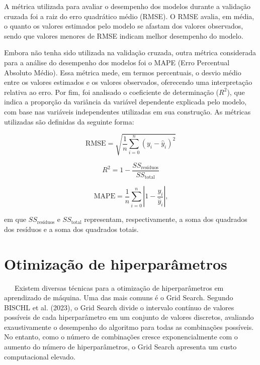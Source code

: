 \documentclass[
  12pt,
  a4paper,
]{scrreprt}
\begin{document}
\vspace{12pt}

A métrica utilizada para avaliar o desempenho dos modelos durante a
validação cruzada foi a raiz do erro quadrático médio (RMSE). O RMSE
avalia, em média, o quanto os valores estimados pelo modelo se afastam
dos valores observados, sendo que valores menores de RMSE indicam melhor
desempenho do modelo.

\vspace{12pt}

Embora não tenha sido utilizada na validação cruzada, outra métrica
considerada para a análise do desempenho dos modelos foi o MAPE (Erro
Percentual Absoluto Médio). Essa métrica mede, em termos percentuais, o
desvio médio entre os valores estimados e os valores observados,
oferecendo uma interpretação relativa ao erro. Por fim, foi analisado o
coeficiente de determinação (\(R^2\)), que indica a proporção da
variância da variável dependente explicada pelo modelo, com base nas
variáveis independentes utilizadas em sua construção. As métricas
utilizadas são definidas da seguinte forma:

\begin{figure}

\begin{minipage}{0.33\linewidth}
\[
\text{RMSE} = \sqrt{\dfrac{1}{n} \sum_{i = 0}^n (y_i - \hat y_i)^2}
\]\end{minipage}%
%
\begin{minipage}{0.33\linewidth}
\[
R^2 = 1 - \dfrac{SS_{\text{resíduos}}}{SS_{\text{total}}}
\]\end{minipage}%
%
\begin{minipage}{0.33\linewidth}
\[
\text{MAPE} = \frac{1}{n} \sum_{i=0}^n \left|1 - \frac{y_i}{\hat y_i}\right|\text{,}
\]\end{minipage}%

\end{figure}%

em que \(SS_{\text{resíduos}}\) e \(SS_{\text{total}}\) representam,
respectivamente, a soma dos quadrados dos resíduos e a soma dos
quadrados totais.

\section{Otimização de
hiperparâmetros}\label{otimizauxe7uxe3o-de-hiperparuxe2metros}

~~~Existem diversas técnicas para a otimização de hiperparâmetros em
aprendizado de máquina. Uma das mais comuns é o Grid Search. Segundo
BISCHL et al. (2023), o Grid Search divide o intervalo contínuo de
valores possíveis de cada hiperparâmetro em um conjunto de valores
discretos, avaliando exaustivamente o desempenho do algoritmo para todas
as combinações possíveis. No entanto, como o número de combinações
cresce exponencialmente com o aumento do número de hiperparâmetros, o
Grid Search apresenta um custo computacional elevado.
\end{document}

